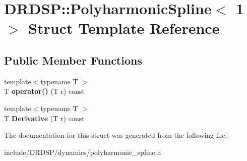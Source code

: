 \hypertarget{struct_d_r_d_s_p_1_1_polyharmonic_spline_3_011_01_4}{\section{D\-R\-D\-S\-P\-:\-:Polyharmonic\-Spline$<$ 1 $>$ Struct Template Reference}
\label{struct_d_r_d_s_p_1_1_polyharmonic_spline_3_011_01_4}
}
\subsection*{Public Member Functions}
\begin{DoxyCompactItemize}
\item 
\hypertarget{struct_d_r_d_s_p_1_1_polyharmonic_spline_3_011_01_4_ab969c8592975972909550dd54e09b0b3}{{\footnotesize template$<$typename T $>$ }\\T {\bfseries operator()} (T r) const }\label{struct_d_r_d_s_p_1_1_polyharmonic_spline_3_011_01_4_ab969c8592975972909550dd54e09b0b3}

\item 
\hypertarget{struct_d_r_d_s_p_1_1_polyharmonic_spline_3_011_01_4_a89606285e81214bed46fec44c5ca083f}{{\footnotesize template$<$typename T $>$ }\\T {\bfseries Derivative} (T r) const }\label{struct_d_r_d_s_p_1_1_polyharmonic_spline_3_011_01_4_a89606285e81214bed46fec44c5ca083f}

\end{DoxyCompactItemize}


The documentation for this struct was generated from the following file\-:\begin{DoxyCompactItemize}
\item 
include/\-D\-R\-D\-S\-P/dynamics/polyharmonic\-\_\-spline.\-h\end{DoxyCompactItemize}
